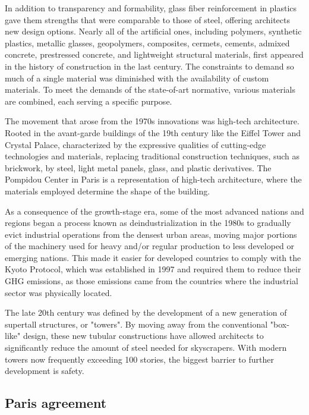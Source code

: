 In addition to transparency and formability, glass fiber reinforcement in plastics gave them strengths that were comparable to those of steel, offering architects new design options.\autocite{koehler1955plastics} Nearly all of the artificial ones, including polymers, synthetic plastics, metallic glasses, geopolymers, composites, cermets, cements, admixed concrete, prestressed concrete, and lightweight structural materials, first appeared in the history of construction in the last century.\autocite{laffarga1997resena} The constraints to demand so much of a single material was diminished with the availability of custom materials. To meet the demands of the state-of-art normative, various materials are combined, each serving a specific purpose.\autocite{krausmann2009growth}

The movement that arose from the 1970s innovations was high-tech architecture. Rooted in the avant-garde buildings of the 19th century like the Eiffel Tower and Crystal Palace, characterized by the expressive qualities of cutting-edge technologies and materials, replacing traditional construction techniques, such as brickwork, by steel, light metal panels, glass, and plastic derivatives.\autocite{sharp2002twentieth} The Pompidou Center in Paris is a representation of high-tech architecture, where the materials employed determine the shape of the building.

As a consequence of the growth-stage era, some of the most advanced nations and regions began a process known as deindustrialization in the 1980s to gradually evict industrial operations from the densest urban areas,\autocite{agueda2016historia} moving major portions of the machinery used for heavy and/or regular production to less developed or emerging nations.\autocite{lopez1993ciudad} This made it easier for developed countries to comply with the Kyoto Protocol, which was established in 1997 and required them to reduce their GHG emissions, as those emissions came from the countries where the industrial sector was physically located.\autocite{agueda2016historia}

The late 20th century was defined by the development of a new generation of supertall structures, or "towers". By moving away from the conventional "box-like" design, these new tubular constructions have allowed architects to significantly reduce the amount of steel needed for skyscrapers. With modern towers now frequently exceeding 100 stories, the biggest barrier to further development is safety.\autocite{sharp2002twentieth}

\subsection{Paris agreement}
\label{sec:paris_agreement}

